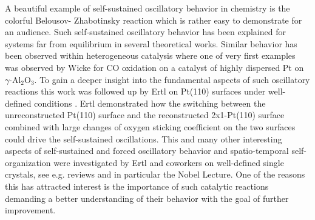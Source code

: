 \documentclass[journal=jacsat,manuscript=article]{achemso}
\begin{document}
A beautiful example of self-sustained oscillatory behavior in chemistry is the
colorful Belousov- Zhabotinsky reaction\cite{ZAIKIN1970} which is rather easy
to demonstrate for an audience. Such self-sustained oscillatory behavior has
been explained for systems far from equilibrium in several theoretical
works\cite{HakenBog,NicolisBog}. Similar behavior has been observed within
heterogeneous catalysis where one of very first examples was observed by Wicke
for CO oxidation on a catalyst
of highly dispersed Pt on $\gamma$-Al$_2$O$_3$\cite{BEUSCH1972}. To gain a
deeper insight into the fundamental aspects of such oscillatory reactions this
work was followed up by Ertl on Pt(110) surfaces under well-defined conditions
\cite{EISWIRTH1986}. Ertl demonstrated how the switching between the
unreconstructed Pt(110) surface and the reconstructed 2x1-Pt(110) surface
combined with large changes of oxygen sticking coefficient on the two surfaces
could drive the self-sustained oscillations. This and many other interesting
aspects of self-sustained and forced oscillatory behavior and spatio-temporal
self-organization were investigated by Ertl and coworkers on well-defined
single crystals, see e.g. reviews\cite{IMBIHL1995,JAKUBITH1990} and in
particular the Nobel Lecture\cite{Ertl2008}. One of the reasons this has
attracted interest is the importance of such catalytic reactions demanding a
better understanding of their behavior with the goal of further improvement. 
\end{document}
